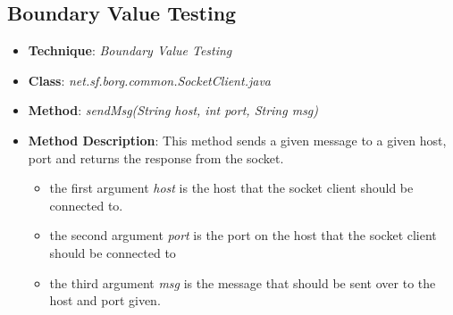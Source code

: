 \documentclass[fontsize=12pt,paper=letter,twoside]{scrartcl}
\begin{document}
\subsection{Boundary Value Testing}
\begin{itemize}
\item \textbf{Technique}: \emph{Boundary Value Testing}
\item \textbf{Class}: \emph{net.sf.borg.common.SocketClient.java}
\item \textbf{Method}: \emph{sendMsg(String host, int port, String msg)}
\item \textbf{Method Description}: This method sends a given message to a given host, port and returns the response from the socket.
\begin{itemize}
\item the first argument \emph{host} is the host that the socket client should be connected to.
\item the second argument \emph{port} is the port on the host that the socket client should be connected to
\item the third argument \emph{msg} is the message that should be sent over to the host and port given.
\end{itemize}


\end{itemize}
\end{document}
